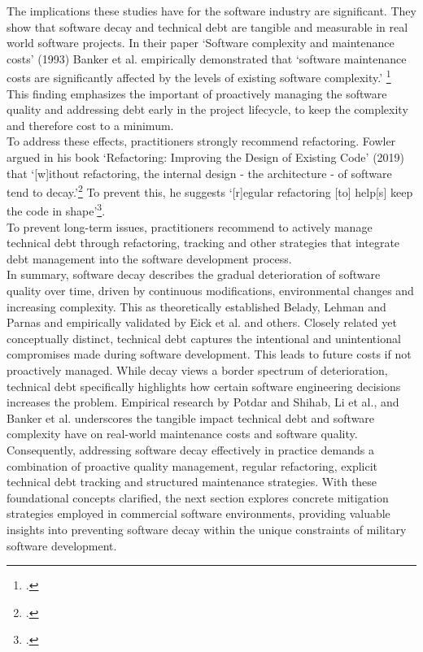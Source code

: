 The implications these studies have for the software industry are significant. They show that software decay and technical debt are tangible and measurable in real world software projects.
In their paper `Software complexity and maintenance costs' (1993) Banker et al. empirically demonstrated that `software maintenance costs are significantly affected by the levels of existing software complexity.' \footcite[12]{bankerSoftwareComplexityMaintenance1993}
This finding emphasizes the important of proactively managing the software quality and addressing debt early in the project lifecycle, to keep the complexity and therefore cost to a minimum.\\
To address these effects, practitioners strongly recommend refactoring. Fowler argued in his book `Refactoring: Improving the Design of Existing Code' (2019)
that `[w]ithout refactoring, the internal design - the architecture - of software tend to decay.'\footcite[58]{fowlerRefactoringImprovingDesign2019}
To prevent this, he suggests `[r]egular refactoring [to] help[s] keep the code in shape'\footcite[58]{fowlerRefactoringImprovingDesign2019}.\\
To prevent long-term issues, practitioners recommend to actively manage technical debt through refactoring, tracking and other strategies 
that integrate debt management into the software development process.\\

In summary, software decay describes the gradual deterioration of software quality over time, driven by continuous modifications, environmental changes and increasing complexity. This as theoretically established Belady, Lehman and Parnas and empirically validated by Eick et al. and others.
Closely related yet conceptually distinct, technical debt captures the intentional and unintentional compromises made during software development. This leads to future costs if not proactively managed.
While decay views a border spectrum of deterioration, technical debt specifically highlights how certain software engineering decisions increases the problem. 
Empirical research by Potdar and Shihab, Li et al., and Banker et al. underscores the tangible impact technical debt and software complexity have on real-world maintenance costs and software quality.
Consequently, addressing software decay effectively in practice demands a combination of proactive quality management, regular refactoring, explicit technical debt tracking and structured maintenance strategies.
With these foundational concepts clarified, the next section explores concrete mitigation strategies employed in commercial software environments, providing valuable insights into preventing software decay within the unique constraints of military software development.



